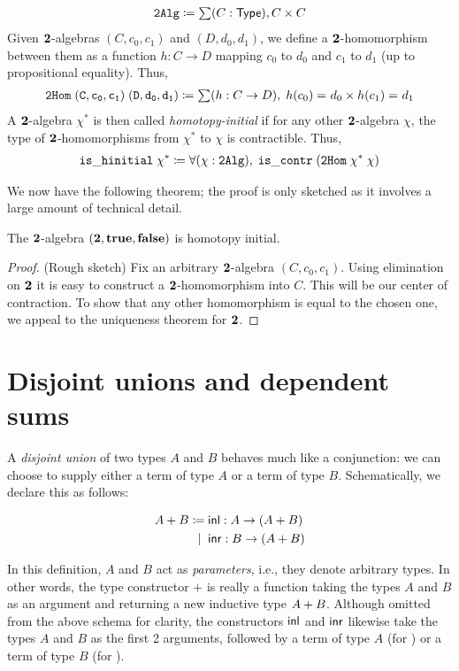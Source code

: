 \begin{align*}
\mathtt{2Alg} \defeq \sm {C : \type} C \times C
\end{align*}
Given $\mathbf{2}$-algebras $(C,c_0,c_1)$ and $(D,d_0,d_1)$, we define a $\mathbf{2}$-homomorphism between them as a function $h : C \to D$ mapping $c_0$ to $d_0$ and
$c_1$ to $d_1$ (up to propositional equality). Thus,
\begin{align*}
\mathtt{2Hom \; (C,c_0,c_1) \; (D,d_0,d_1)} \defeq \sm {h : C \to D} \; \id{h(c_0)}{d_0} \times \id{h(c_1)}{d_1}
\end{align*}
A $\mathbf{2}$-algebra $\chi^*$ is then called \emph{homotopy-initial} if for any other $\mathbf{2}$-algebra $\chi$, the type of $\mathbf{2}$-homomorphisms from $\chi^*$ to $\chi$ is contractible. Thus,
\begin{align*}
\mathtt{is\_hinitial \; \chi^* \defeq \fall{\chi : 2Alg} \; is\_contr \; (2Hom \; \chi^*\; \chi)}
\end{align*}

We now have the following theorem; the proof is only sketched as it involves a large amount of technical detail.
\begin{thm}
The $\mathbf{2}$-algebra $(\mathbf{2}, \mathbf{true}, \mathbf{false})$ is homotopy initial.
\end{thm}
\begin{proof}
(Rough sketch) Fix an arbitrary $\mathbf{2}$-algebra $(C,c_0,c_1)$. Using elimination on $\mathbf{2}$ it is easy to construct a $\mathbf{2}$-homomorphism into $C$. This will be our
center of contraction. To show that any other homomorphism is equal to the chosen one, we appeal to the uniqueness theorem for $\mathbf{2}$.
\end{proof}

\section{Disjoint unions and dependent sums}
A \emph{disjoint union} of two types $A$ and $B$ behaves much like a conjunction: we can choose to supply either a term of type $A$ or a term of type $B$. Schematically, we declare this as follows:

\begin{align*}
  A + B \coloneqq \; & \mathsf{inl} : A \to (A + B) \\
         \;|\;\; & \mathsf{inr} : B \to (A + B)
\end{align*}

In this definition, $A$ and $B$ act as \emph{parameters}, i.e., they denote arbitrary types. In other words, the type constructor $+$ is really a function taking the types $A$ and $B$ as an argument and returning a new inductive type $A + B$. Although omitted from the above schema for clarity, the constructors $\mathsf{inl}$ and $\mathsf{inr}$ likewise take the types $A$ and $B$ as the first 2 arguments, followed by a term of type $A$ (for \inl) or a term of type $B$ (for \inr).

